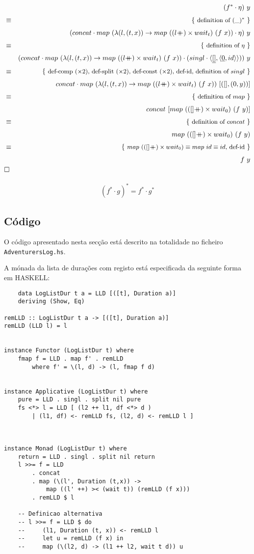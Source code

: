 \documentclass[12pt]{extarticle}
\newcommand\mdoubleplus{\ensuremath{\mathbin{+\mkern-10mu+}}}
\def\comp{\mathbin{\cdot}}
\def\start{&&}
\def\qed{\\&\Box&}
\def\just#1#2{\\ &#1& \rule{2em}{0pt} \{ \mbox{\rule[-.7em]{0pt}{1.8em} \small #2 \/} \} \nonumber\\ && }
\begin{document}
\begin{eqnarray*}
    \start
        (f^* \comp \eta)\ y
    \just\equiv{ definition of $(\_)^*$}
        (concat \comp map\ (\lambda (l, (t,x)) \rightarrow map\ ((l \mdoubleplus) \times wait_t)\ (f\ x)) \comp \eta)\ y
    \just\equiv{ definition of $\eta$ }
        (concat \comp map\ (\lambda (l, (t,x)) \rightarrow map\ ((l \mdoubleplus) \times wait_t)\ (f\ x)) \comp (singl \comp \langle \underline{[]}, \langle \underline{0}, id \rangle \rangle))\ y
    \just\equiv{ def-comp ($\times 2$), def-split ($\times 2$), def-const ($\times 2$), def-id, definition of $singl$ }
        concat \comp map\ (\lambda (l, (t,x)) \rightarrow map\ ((l \mdoubleplus) \times wait_t)\ (f\ x))\ [([],(0,y))]
    \just\equiv{ definition of $map$ }
        concat\ [map\ (([] \mdoubleplus) \times wait_0)\ (f\ y)]
    \just\equiv{ definition of $concat$ }
        map\ (([] \mdoubleplus) \times wait_0)\ (f\ y)
    \just\equiv{ $map\ (([] \mdoubleplus) \times wait_0) \equiv map\ id \equiv id$, def-id }
        f\ y
    \qed
\end{eqnarray*}


\begin{eqnarray*}
        (f^* \comp g)^* = f^* \comp g^*
\end{eqnarray*}

\subsection{Código}
O código apresentado nesta secção está descrito na totalidade no ficheiro \texttt{AdventurersLog.hs}.

A mónada da lista de durações com registo está especificada da seguinte forma em HASKELL:
\begin{lstlisting}
    data LogListDur t a = LLD [([t], Duration a)]
    deriving (Show, Eq)

remLLD :: LogListDur t a -> [([t], Duration a)]
remLLD (LLD l) = l 


instance Functor (LogListDur t) where
    fmap f = LLD . map f' . remLLD
        where f' = \(l, d) -> (l, fmap f d)


instance Applicative (LogListDur t) where
    pure = LLD . singl . split nil pure
    fs <*> l = LLD [ (l2 ++ l1, df <*> d )
        | (l1, df) <- remLLD fs, (l2, d) <- remLLD l ]



instance Monad (LogListDur t) where
    return = LLD . singl . split nil return
    l >>= f = LLD
        . concat
        . map (\(l', Duration (t,x)) -> 
            map ((l' ++) >< (wait t)) (remLLD (f x)))
        . remLLD $ l
    
    -- Definicao alternativa
    -- l >>= f = LLD $ do
    --     (l1, Duration (t, x)) <- remLLD l
    --     let u = remLLD (f x) in 
    --     map (\(l2, d) -> (l1 ++ l2, wait t d)) u
\end{lstlisting}
\end{document}
